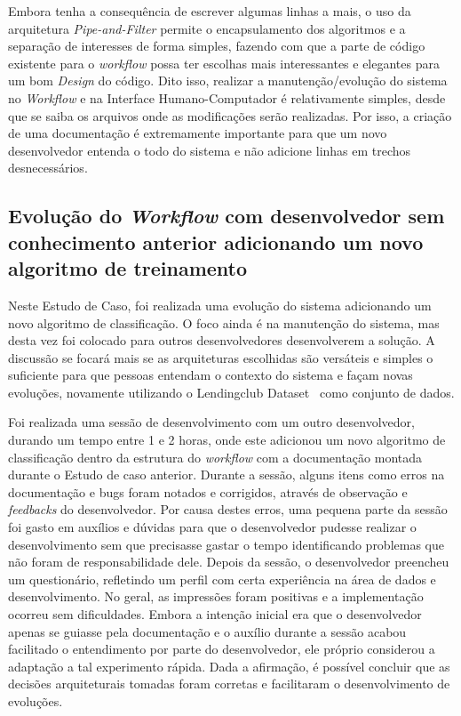 \documentclass{article}
\begin{document}
Embora tenha a consequência de escrever algumas linhas a mais, o uso da arquitetura \textit{Pipe-and-Filter} permite o encapsulamento dos algoritmos e a separação de interesses de forma simples, fazendo com que a parte de código existente para o \textit{workflow} possa ter escolhas mais interessantes e elegantes para um bom \textit{Design} do código. Dito isso, realizar a manutenção/evolução do sistema no \textit{Workflow} e na Interface Humano-Computador é relativamente simples, desde que se saiba os arquivos onde as modificações serão realizadas. Por isso, a criação de uma documentação é extremamente importante para que um novo desenvolvedor entenda o todo do sistema e não adicione linhas em trechos desnecessários.

\subsection{Evolução do \textit{Workflow} com desenvolvedor sem conhecimento anterior adicionando um novo algoritmo de treinamento}

Neste Estudo de Caso, foi realizada uma evolução do sistema adicionando um novo algoritmo de classificação. O foco ainda é na manutenção do sistema, mas desta vez foi colocado para outros desenvolvedores desenvolverem a solução. A discussão se focará mais se as arquiteturas escolhidas são versáteis e simples o suficiente para que pessoas entendam o contexto do sistema e façam novas evoluções, novamente utilizando o Lendingclub Dataset~\citep{lendingclub_2022} como conjunto de dados. 

Foi realizada uma sessão de desenvolvimento com um outro desenvolvedor, durando um tempo entre 1 e 2 horas, onde este adicionou um novo algoritmo de classificação dentro da estrutura do \textit{workflow} com a documentação montada durante o Estudo de caso anterior. Durante a sessão, alguns itens como erros na documentação e bugs foram notados e corrigidos, através de observação e \textit{feedbacks} do desenvolvedor. Por causa destes erros, uma pequena parte da sessão foi gasto em auxílios e dúvidas para que o desenvolvedor pudesse realizar o desenvolvimento sem que precisasse gastar o tempo identificando problemas que não foram de responsabilidade dele. Depois da sessão, o desenvolvedor preencheu um questionário, refletindo um perfil com certa experiência na área de dados e desenvolvimento. No geral, as impressões foram positivas e a implementação ocorreu sem dificuldades. Embora a intenção inicial era que o desenvolvedor apenas se guiasse pela documentação e o auxílio durante a sessão acabou facilitado o entendimento por parte do desenvolvedor, ele próprio considerou a adaptação a tal experimento rápida. Dada a afirmação, é possível concluir que as decisões arquiteturais tomadas foram corretas e facilitaram o desenvolvimento de evoluções.
\end{document}
